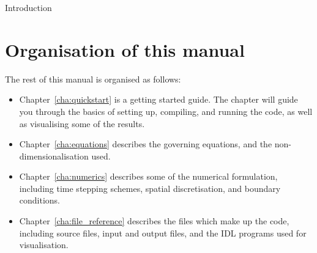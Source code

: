 \begin{chapter}{\label{cha:introduction}Introduction}
  \section{Organisation of this manual}
  The rest of this manual is organised as follows:
  \begin{itemize}
    \item Chapter~\ref{cha:quickstart} is a getting started guide.  The chapter
      will guide you through the basics of setting up, compiling, and running
      the code, as well as visualising some of the results.
    \item Chapter~\ref{cha:equations} describes the governing equations, and
      the non-dimensionalisation used.
    \item Chapter~\ref{cha:numerics} describes some of the numerical
      formulation, including time stepping schemes, spatial discretisation, and
      boundary conditions.
    \item Chapter~\ref{cha:file_reference} describes the files which make up
      the code, including source files, input and output files, and the IDL
      programs used for visualisation.
  \end{itemize}
\end{chapter}
